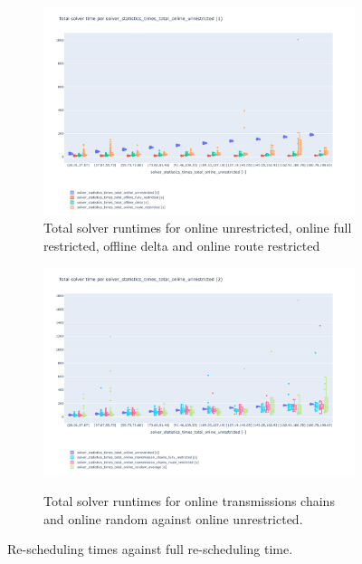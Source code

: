 \documentclass{article}
\begin{document}
\begin{figure}[hbtp]
	\begin{subfigure}{\textwidth}
        \includegraphics[width=\textwidth]{Figures/04_computational_results/times_total_per_times_total_online_unrestricted_1.pdf}
        \caption{Total solver runtimes for online unrestricted, online full restricted, offline delta and online route restricted}
        \label{fig:computationtimes_absolute_1}
    \end{subfigure}

    \begin{subfigure}{\textwidth}
          \includegraphics[width=\textwidth]{Figures/04_computational_results/times_total_per_times_total_online_unrestricted_2.pdf}
          \label{fig:computationtimes_absolute_2}
          \caption{Total solver runtimes for online transmissions chains and online random against online unrestricted.}
     \end{subfigure}
	\caption{Re-scheduling times against full re-scheduling time.}
	\label{fig:computationtimes}
\end{figure}
\end{document}
